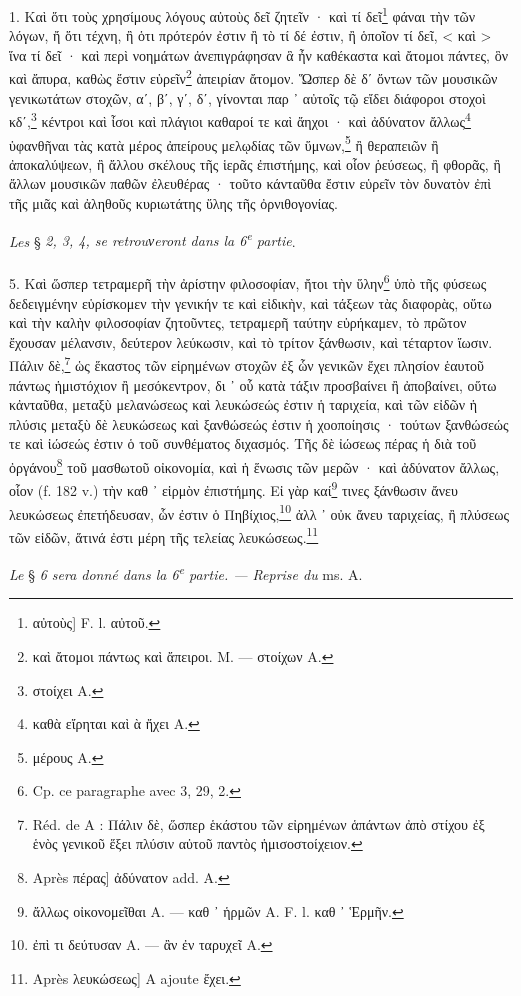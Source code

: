 \documentclass[a4paper, 11pt, oneside, polutonikogreek, french]{article}
\begin{document}
\bigskip

1. Καὶ ὅτι τοὺς χρησίμους λόγους αὐτοὺς δεῖ ζητεῖν · καὶ τί δεῖ\footnote{αὐτοὺς] F. l. αὐτοῦ.} φάναι τὴν τῶν λόγων, ἤ ὅτι τέχνη, ἢ ὁτι πρότερόν ἐστιν ἢ τὸ τί δέ ἐστιν, ἢ ὁποῖον τί δεῖ, < καὶ > ἵνα τί δεῖ · καὶ περὶ νοημάτων ἀνεπιγράφησαν ἃ ἦν καθέκαστα καὶ ἄτομοι πάντες, ὃν καὶ ἄπυρα, καθὼς ἔστιν εὑρεῖν\footnote{καὶ ἄτομοι πάντως καὶ ἄπειροι. M. --- στοίχων A.} ἀπειρίαν ἄτομον. Ὥσπερ δὲ δʹ ὄντων τῶν μουσικῶν γενικωτάτων στοχῶν, αʹ, βʹ, γʹ, δʹ, γίνονται παρ ᾽ αὐτοῖς τῷ εἴδει διάφοροι στοχοὶ κδʹ,\footnote{στοίχει A.} κέντροι καὶ ἶσοι καὶ πλάγιοι καθαροί τε καὶ ἄηχοι · καὶ ἀδύνατον ἄλλως\footnote{καθὰ εἴρηται καὶ ὰ ἤχει A.} ὑφανθῆναι τὰς κατὰ μέρος ἀπείρους μελῳδίας τῶν ὕμνων,\footnote{μέρους A.} ἢ θεραπειῶν ἢ ἀποκαλύψεων, ἢ ἄλλου σκέλους τῆς ἱερᾶς ἐπιστήμης, καὶ οἷον ῥεύσεως, ἢ φθορᾶς, ἢ ἄλλων μουσικῶν παθῶν ἐλευθέρας · τοῦτο κάνταῦθα ἔστιν εὑρεῖν τὸν δυνατὸν ἐπὶ τῆς μιᾶς καὶ ἀληθοῦς κυριωτάτης ὕλης τῆς ὀρνιθογονίας.
\begin{center}
\emph{Les} § \emph{2, 3, 4, se retrouνeront dans la 6\textsuperscript{e} partie}.
\end{center}
\paragraph{}
5. Καὶ ὥσπερ τετραμερῆ τὴν ἀρίστην φιλοσοφίαν, ἤτοι τὴν ὕλην\footnote{Cp. ce paragraphe avec 3, 29, 2.} ὑπὸ τῆς φύσεως δεδειγμένην εὑρίσκομεν τὴν γενικήν τε καὶ εἰδικὴν, καὶ τάξεων τὰς διαφορὰς, οὕτω καὶ τὴν καλὴν φιλοσοφίαν ζητοῦντες, τετραμερῆ ταύτην εὑρήκαμεν, τὸ πρῶτον ἔχουσαν μέλανσιν, δεύτερον λεύκωσιν, καὶ τὸ τρίτον ξάνθωσιν, καὶ τέταρτον ἴωσιν. Πάλιν δὲ,\footnote{Réd. de A : Πάλιν δὲ, ὥσπερ ἑκάστου τῶν εἰρημένων ἁπάντων ἀπὸ στίχου ἐξ ἑνὸς γενικοῦ ἕξει πλύσιν αὐτοῦ παντὸς ἡμισοστοίχειον.} ὡς ἕκαστος τῶν εἰρημένων στοχῶν ἐξ ὧν γενικῶν ἔχει πλησίον ἑαυτοῦ πάντως ἡμιστόχιον ἢ μεσόκεντρον, δι ᾽ οὗ κατὰ τάξιν προσβαίνει ἢ ἀποβαίνει, οὕτω κἀνταῦθα, μεταξὺ μελανώσεως καὶ λευκώσεώς ἐστιν ἡ ταριχεία, καὶ τῶν εἰδῶν ἡ πλύσις μεταξὺ δὲ λευκώσεως καὶ ξανθώσεώς ἐστιν ἡ χοοποίησις · τούτων ξανθώσεώς τε καὶ ἰώσεώς ἐστιν ὁ τοῦ συνθέματος διχασμός. Τῆς δὲ ἰώσεως πέρας ἡ διὰ τοῦ ὀργάνου\footnote{Après πέρας] ἀδύνατον add. A.} τοῦ μασθωτοῦ οἰκονομία, καὶ ἡ ἕνωσις τῶν μερῶν · καὶ ἀδύνατον ἄλλως, οἷον (f. 182 v.) τὴν καθ ᾽ εἱρμὸν ἐπιστήμης. Εἰ γὰρ καί\footnote{ἄλλως οἰκονομεῖθαι A. --- καθ ᾽ ἡρμῶν A. F. l. καθ ᾽ Ἑρμῆν.} τινες ξάνθωσιν ἄνευ λευκώσεως ἐπετήδευσαν, ὧν ἐστιν ὁ Πηβίχιος,\footnote{ἐπὶ τι δεύτυσαν A. --- ἂν ἐν ταρυχεῖ A.} ἀλλ ᾽ οὐκ ἄνευ ταριχείας, ἢ πλύσεως τῶν εἰδῶν, ἅτινά ἐστι μέρη τῆς τελείας λευκώσεως.\footnote{Après λευκώσεως] A ajoute ἔχει.}
\begin{center}
\emph{Le} § \emph{6 sera donné dans la 6\textsuperscript{e} partie. --- Reprise du} ms. A.
\end{center}
\end{document}
